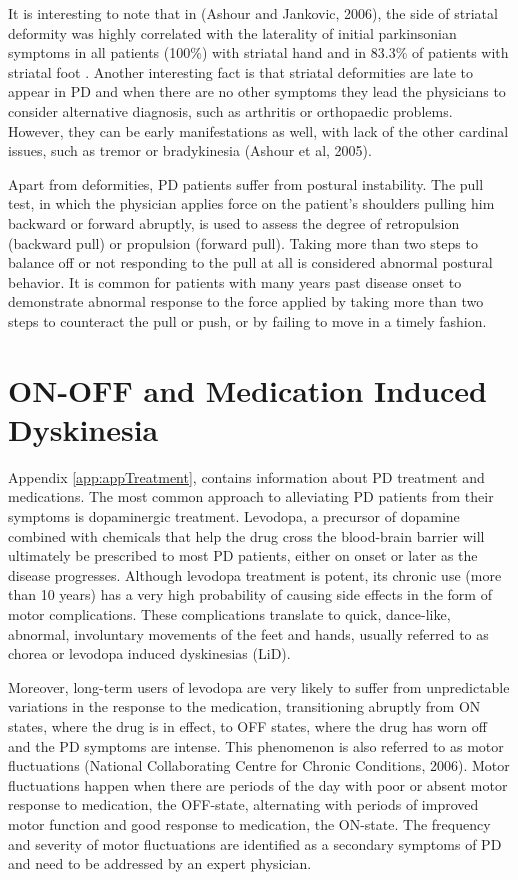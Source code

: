 It is interesting to note that in (Ashour and Jankovic, 2006), the side of striatal deformity was highly correlated with the laterality of initial parkinsonian symptoms in all patients (100\%) with striatal hand and in 83.3\% of patients with striatal foot . Another interesting fact is that striatal deformities are late to appear in \gls{PD} and when there are no other symptoms they lead the physicians to consider alternative diagnosis, such as arthritis or orthopaedic problems. However, they can be early manifestations as well, with lack of the other cardinal issues, such as tremor or bradykinesia (Ashour et al, 2005).

Apart from deformities, \gls{PD} patients suffer from postural instability. The pull test, in which the physician applies force on the patient's shoulders pulling him backward or forward abruptly, is used to assess the degree of retropulsion (backward pull) or propulsion (forward pull). Taking more than two steps to balance off or not responding to the pull at all is considered abnormal postural behavior. It is common for patients with many years past disease onset to demonstrate abnormal response to the force applied by taking more than two steps to counteract the pull or push, or by failing to move in a timely fashion. 


\section{ON-OFF and Medication Induced Dyskinesia}
\label{sec:dyskinesia}
Appendix \ref{app:appTreatment}, contains information about \gls{PD} treatment and medications. The most common approach to alleviating \gls{PD} patients from their symptoms is dopaminergic treatment. Levodopa, a precursor of dopamine combined with chemicals that help the drug cross the blood-brain barrier will ultimately be prescribed to most \gls{PD} patients, either on onset or later as the disease progresses. Although levodopa treatment is potent, its chronic use (more than 10 years) has a very high probability of causing side effects in the form of motor complications. These complications translate to quick, dance-like, abnormal, involuntary movements of the feet and hands, usually referred to as chorea or levodopa induced dyskinesias (\gls{LiD}). 

Moreover, long-term users of levodopa are very likely to suffer from unpredictable variations in the response to the medication, transitioning abruptly from ON states, where the drug is in effect, to OFF states, where the drug has worn off and the \gls{PD} symptoms are intense. This phenomenon is also referred to as motor fluctuations (National Collaborating Centre for Chronic Conditions, 2006). Motor fluctuations happen when there are periods of the day with poor or absent motor response to medication, the OFF-state, alternating with periods of improved motor function and good response to medication, the ON-state. The frequency and severity of motor fluctuations are identified as a secondary symptoms of \gls{PD} and need to be addressed by an expert physician. 

